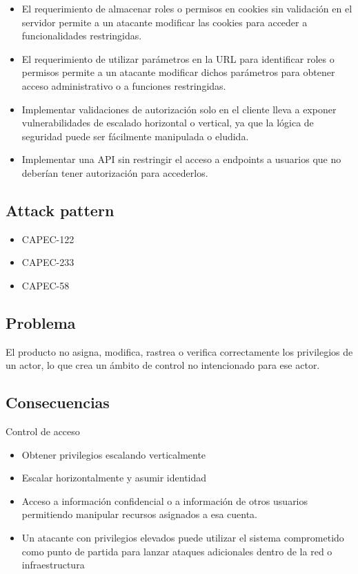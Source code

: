 \begin{itemize}
    \item El requerimiento de almacenar roles o permisos en cookies sin validación en el servidor permite a un atacante modificar las cookies para acceder a funcionalidades restringidas.
    \item El requerimiento de utilizar parámetros en la URL para identificar roles o permisos permite a un atacante modificar dichos parámetros para obtener acceso administrativo o a funciones restringidas.
    \item Implementar validaciones de autorización solo en el cliente lleva a exponer vulnerabilidades de escalado horizontal o vertical, ya que la lógica de seguridad puede ser fácilmente manipulada o eludida.
    \item Implementar una API sin restringir el acceso a endpoints a usuarios que no deberían tener autorización para accederlos.
\end{itemize}

\subsection{Attack pattern}
\begin{itemize}
    \item CAPEC-122
    \item CAPEC-233
    \item CAPEC-58
\end{itemize}
\subsection{Problema}
El producto no asigna, modifica, rastrea o verifica correctamente los privilegios de un actor, lo que crea un ámbito de control no intencionado para ese actor.
\subsection{Consecuencias}
Control de acceso
\begin{itemize}
    \item Obtener privilegios escalando verticalmente
    \item Escalar horizontalmente y asumir identidad
    \item Acceso a información confidencial o a información de otros usuarios permitiendo manipular recursos asignados a esa cuenta.
    \item Un atacante con privilegios elevados puede utilizar el sistema comprometido como punto de partida para lanzar ataques adicionales dentro de la red o infraestructura
\end{itemize}

